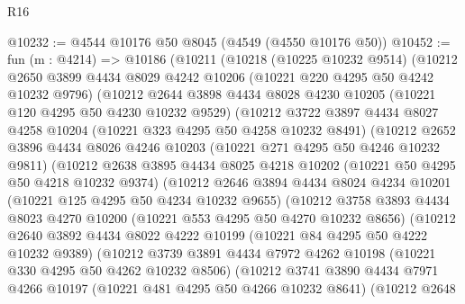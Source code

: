 \begin{lexlean}{R16}
\begin{coremodule}
@10232 := @4544 @10176 @50 @8045 (@4549 (@4550 @10176 @50))
@10452 := fun (m : @4214) =>
  @10186
    (@10211
      (@10218
        (@10225 @10232 @9514)
        (@10212
          @2650
          @3899
          @4434
          @8029
          @4242
          @10206
          (@10221 @220 @4295 @50 @4242 @10232 @9796)
          (@10212
            @2644
            @3898
            @4434
            @8028
            @4230
            @10205
            (@10221 @120 @4295 @50 @4230 @10232 @9529)
            (@10212
              @3722
              @3897
              @4434
              @8027
              @4258
              @10204
              (@10221 @323 @4295 @50 @4258 @10232 @8491)
              (@10212
                @2652
                @3896
                @4434
                @8026
                @4246
                @10203
                (@10221 @271 @4295 @50 @4246 @10232 @9811)
                (@10212
                  @2638
                  @3895
                  @4434
                  @8025
                  @4218
                  @10202
                  (@10221 @50 @4295 @50 @4218 @10232 @9374)
                  (@10212
                    @2646
                    @3894
                    @4434
                    @8024
                    @4234
                    @10201
                    (@10221 @125 @4295 @50 @4234 @10232 @9655)
                    (@10212
                      @3758
                      @3893
                      @4434
                      @8023
                      @4270
                      @10200
                      (@10221 @553 @4295 @50 @4270 @10232 @8656)
                      (@10212
                        @2640
                        @3892
                        @4434
                        @8022
                        @4222
                        @10199
                        (@10221 @84 @4295 @50 @4222 @10232 @9389)
                        (@10212
                          @3739
                          @3891
                          @4434
                          @7972
                          @4262
                          @10198
                          (@10221 @330 @4295 @50 @4262 @10232 @8506)
                          (@10212
                            @3741
                            @3890
                            @4434
                            @7971
                            @4266
                            @10197
                            (@10221 @481 @4295 @50 @4266 @10232 @8641)
                            (@10212
                              @2648

\end{coremodule}
\end{lexlean}
